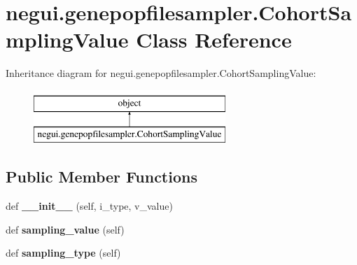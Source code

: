 \hypertarget{classnegui_1_1genepopfilesampler_1_1CohortSamplingValue}{}\section{negui.\+genepopfilesampler.\+Cohort\+Sampling\+Value Class Reference}
\label{classnegui_1_1genepopfilesampler_1_1CohortSamplingValue}
Inheritance diagram for negui.\+genepopfilesampler.\+Cohort\+Sampling\+Value\+:\begin{figure}[H]
\begin{center}
\leavevmode
\includegraphics[height=2.000000cm]{classnegui_1_1genepopfilesampler_1_1CohortSamplingValue}
\end{center}
\end{figure}
\subsection*{Public Member Functions}
\begin{DoxyCompactItemize}
\item 
def {\bfseries \+\_\+\+\_\+init\+\_\+\+\_\+} (self, i\+\_\+type, v\+\_\+value)\hypertarget{classnegui_1_1genepopfilesampler_1_1CohortSamplingValue_aaf19161190cabbef80802059770ede18}{}\label{classnegui_1_1genepopfilesampler_1_1CohortSamplingValue_aaf19161190cabbef80802059770ede18}

\item 
def {\bfseries sampling\+\_\+value} (self)\hypertarget{classnegui_1_1genepopfilesampler_1_1CohortSamplingValue_a00a40570f4b1c3e351098bb7d907359c}{}\label{classnegui_1_1genepopfilesampler_1_1CohortSamplingValue_a00a40570f4b1c3e351098bb7d907359c}

\item 
def {\bfseries sampling\+\_\+type} (self)\hypertarget{classnegui_1_1genepopfilesampler_1_1CohortSamplingValue_a873766c4800201f35deaca7064944731}{}\label{classnegui_1_1genepopfilesampler_1_1CohortSamplingValue_a873766c4800201f35deaca7064944731}

\end{DoxyCompactItemize}
